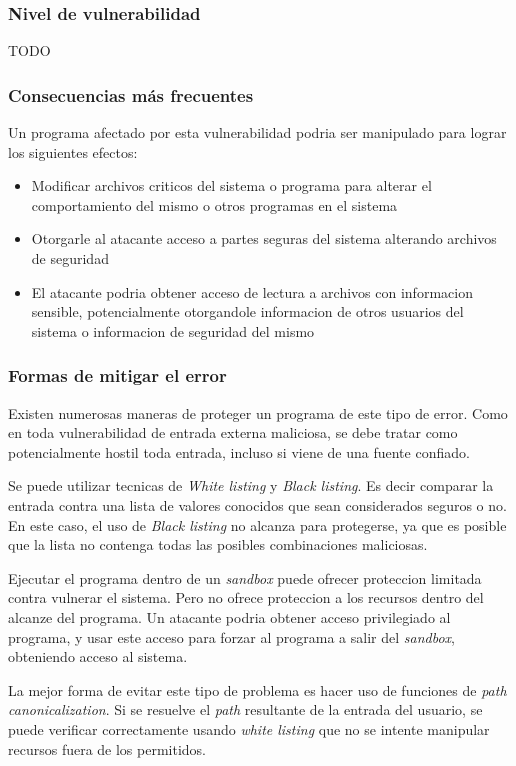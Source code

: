 \subsubsection{Nivel de vulnerabilidad}

TODO

\subsubsection{Consecuencias más frecuentes}

Un programa afectado por esta vulnerabilidad podria ser manipulado para lograr los siguientes efectos:

\begin{itemize}

    \item Modificar archivos criticos del sistema o programa para alterar el comportamiento del mismo o otros programas en el sistema

    \item Otorgarle al atacante acceso a partes seguras del sistema alterando archivos de seguridad

    \item El atacante podria obtener acceso de lectura a archivos con informacion sensible, potencialmente otorgandole informacion de otros usuarios del sistema o informacion de seguridad del mismo

\end{itemize}

\subsubsection{Formas de mitigar el error}

Existen numerosas maneras de proteger un programa de este tipo de error.
Como en toda vulnerabilidad de entrada externa maliciosa, se debe tratar como potencialmente hostil toda entrada, incluso si viene de una fuente confiado.

Se puede utilizar tecnicas de \textit{White listing} y \textit{Black listing}.
Es decir comparar la entrada contra una lista de valores conocidos que sean considerados seguros o no.
En este caso, el uso de \textit{Black listing} no alcanza para protegerse, ya que es posible que la lista no contenga todas las posibles combinaciones maliciosas.

Ejecutar el programa dentro de un \textit{sandbox} puede ofrecer proteccion limitada contra vulnerar el sistema.
Pero no ofrece proteccion a los recursos dentro del alcanze del programa.
Un atacante podria obtener acceso privilegiado al programa, y usar este acceso para forzar al programa a salir del \textit{sandbox}, obteniendo acceso al sistema.

La mejor forma de evitar este tipo de problema es hacer uso de funciones de \textit{path canonicalization}.
Si se resuelve el \textit{path} resultante de la entrada del usuario, se puede verificar correctamente usando \textit{white listing} que no se intente manipular recursos fuera de los permitidos.


